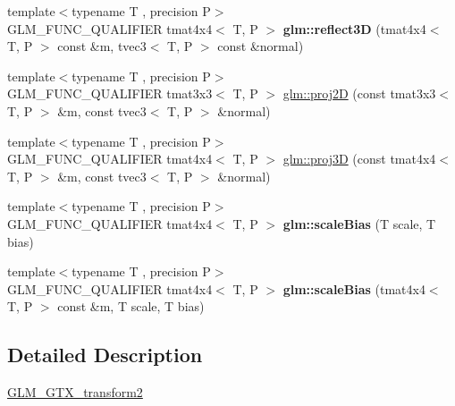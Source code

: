 \begin{DoxyCompactItemize}
\item 
\mbox{\label{transform2_8inl_a03c85c3e6c2861030e037f7aad86eaf3}} 
{\footnotesize template$<$typename T , precision P$>$ }\\G\+L\+M\+\_\+\+F\+U\+N\+C\+\_\+\+Q\+U\+A\+L\+I\+F\+I\+ER tmat4x4$<$ T, P $>$ {\bfseries glm\+::reflect3D} (tmat4x4$<$ T, P $>$ const \&m, tvec3$<$ T, P $>$ const \&normal)
\item 
{\footnotesize template$<$typename T , precision P$>$ }\\G\+L\+M\+\_\+\+F\+U\+N\+C\+\_\+\+Q\+U\+A\+L\+I\+F\+I\+ER tmat3x3$<$ T, P $>$ \hyperlink{group__gtx__transform2_gacfce1085167a8bfb71a55ea14d22752f}{glm\+::proj2D} (const tmat3x3$<$ T, P $>$ \&m, const tvec3$<$ T, P $>$ \&normal)
\item 
{\footnotesize template$<$typename T , precision P$>$ }\\G\+L\+M\+\_\+\+F\+U\+N\+C\+\_\+\+Q\+U\+A\+L\+I\+F\+I\+ER tmat4x4$<$ T, P $>$ \hyperlink{group__gtx__transform2_gafab0418f2503ec2133cb2de828cc482a}{glm\+::proj3D} (const tmat4x4$<$ T, P $>$ \&m, const tvec3$<$ T, P $>$ \&normal)
\item 
\mbox{\label{transform2_8inl_a9760927365b8beff0213eedeca8cc61d}} 
{\footnotesize template$<$typename T , precision P$>$ }\\G\+L\+M\+\_\+\+F\+U\+N\+C\+\_\+\+Q\+U\+A\+L\+I\+F\+I\+ER tmat4x4$<$ T, P $>$ {\bfseries glm\+::scale\+Bias} (T scale, T bias)
\item 
\mbox{\label{transform2_8inl_a1837ceec02ebea68fd86b09e11a61979}} 
{\footnotesize template$<$typename T , precision P$>$ }\\G\+L\+M\+\_\+\+F\+U\+N\+C\+\_\+\+Q\+U\+A\+L\+I\+F\+I\+ER tmat4x4$<$ T, P $>$ {\bfseries glm\+::scale\+Bias} (tmat4x4$<$ T, P $>$ const \&m, T scale, T bias)
\end{DoxyCompactItemize}


\subsection{Detailed Description}
\hyperlink{group__gtx__transform2}{G\+L\+M\+\_\+\+G\+T\+X\+\_\+transform2} 